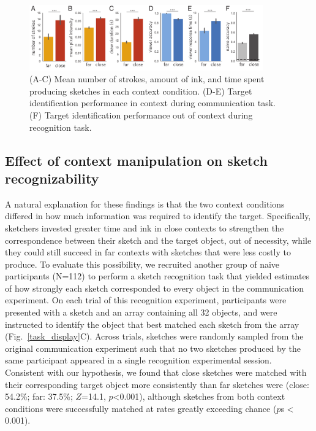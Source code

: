 \documentclass[9pt,twocolumn,twoside]{pnas-new}
\begin{document}
\begin{figure}[htbp]
\centering
\includegraphics[width=0.9\textwidth]{figures/3_behavioral_performance.pdf}
\caption{(A-C) Mean number of strokes, amount of ink, and time spent producing sketches in each context condition. (D-E) Target identification performance in context during communication task. (F) Target identification performance out of context during recognition task.}
\label{task_performance}
\end{figure}


\subsection*{Effect of context manipulation on sketch recognizability}

A natural explanation for these findings is that the two context conditions differed in how much information was required to identify the target. 
Specifically, sketchers invested greater time and ink in close contexts to strengthen the correspondence between their sketch and the target object, out of necessity, while they could still succeed in far contexts with sketches that were less costly to produce.
To evaluate this possibility, we recruited another group of naive participants (N=112) to perform a sketch recognition task that yielded estimates of how strongly each sketch corresponded to every object in the communication experiment. 
On each trial of this recognition experiment, participants were presented with a sketch and an array containing all 32 objects, and were instructed to identify the object that best matched each sketch from the array (Fig.~\ref{task_display}C). 
Across trials, sketches were randomly sampled from the original communication experiment such that no two sketches produced by the same participant appeared in a single recognition experimental session. 
Consistent with our hypothesis, we found that close sketches were matched with their corresponding target object more consistently than far sketches were (close: 54.2\%; far: 37.5\%; $Z$=14.1, $p$<0.001), although sketches from both context conditions were successfully matched at rates greatly exceeding chance ($p$s < 0.001).
\end{document}

